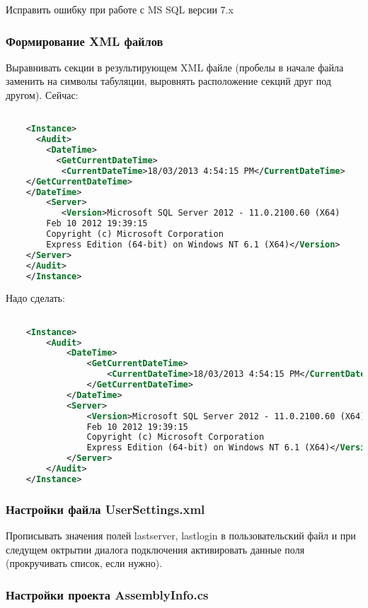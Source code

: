 Исправить ошибку при работе с MS SQL версии 7.x

\subsubsection{Формирование XML файлов}

Выравнивать секции в результирующем XML файле (пробелы в начале файла заменить на символы табуляции,
выровнять расположение секций друг под другом). Сейчас:

\begin{lstlisting}[language=XML,label=existing version of xml,caption=OLD.xml]

	<Instance>
	  <Audit>
		<DateTime>
		  <GetCurrentDateTime>
		   <CurrentDateTime>18/03/2013 4:54:15 PM</CurrentDateTime>
	</GetCurrentDateTime>
	</DateTime>
		<Server>
		   <Version>Microsoft SQL Server 2012 - 11.0.2100.60 (X64)
		Feb 10 2012 19:39:15
		Copyright (c) Microsoft Corporation
		Express Edition (64-bit) on Windows NT 6.1 (X64)</Version>
	</Server>
	</Audit>
	</Instance>

\end{lstlisting}

Надо сделать:

\begin{lstlisting}[language=XML,label=new version of xml,caption=NEW.xml]

	<Instance>
		<Audit>
			<DateTime>
				<GetCurrentDateTime>
					<CurrentDateTime>18/03/2013 4:54:15 PM</CurrentDateTime>
				</GetCurrentDateTime>
			</DateTime>
			<Server>
				<Version>Microsoft SQL Server 2012 - 11.0.2100.60 (X64)
				Feb 10 2012 19:39:15
				Copyright (c) Microsoft Corporation
				Express Edition (64-bit) on Windows NT 6.1 (X64)</Version>
			</Server>
		</Audit>
	</Instance>

\end{lstlisting}

\subsubsection{Настройки файла UserSettings.xml}

Прописывать значения полей lastserver, lastlogin в пользовательский файл и при следущем октрытии
диалога подключения активировать данные поля (прокручивать список, если нужно).

\subsubsection{Настройки проекта AssemblyInfo.cs}

